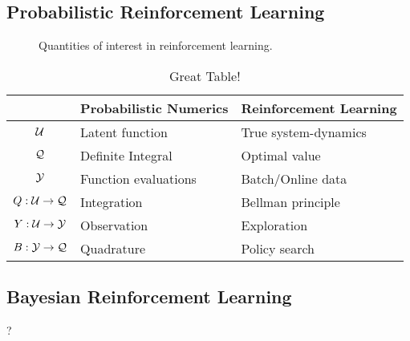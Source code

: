 \subsection{Probabilistic Reinforcement Learning}
\label{sub:reinforcement_learning:probabilistic_reinforcement_learning}
\begin{figure}[t]
    \centering
    
    \caption[Quantities of interest in reinforcement learning]{
        Quantities of interest in reinforcement learning.
        \label{fig:reinforcement_learning:quantities_of_interest_rl}
    }
\end{figure}
\begin{table}[t]
    \centering
    \caption{Great Table!}
    \label{tab:reinforcement_learning:label}
    \begin{tabularx}{\textwidth}{cYY}
        \toprule
        & Probabilistic Numerics & Reinforcement Learning \\
        \midrule
        $\mathcal{U}$ & Latent function & True system-dynamics \\
        $\mathcal{Q}$ & Definite Integral & Optimal value \\
        $\mathcal{Y}$ & Function evaluations & Batch/Online data \\
        \midrule
        $Q : \mathcal{U} \to \mathcal{Q}$ & Integration & Bellman principle \\
        $Y : \mathcal{U} \to \mathcal{Y}$ & Observation & Exploration \\
        $B : \mathcal{Y} \to \mathcal{Q}$ & Quadrature & Policy search \\
        \bottomrule
    \end{tabularx}
\end{table}


\subsection{Bayesian Reinforcement Learning}
\label{sub:reinforcement_learning:bayesian_reinforcement_learning}
?

